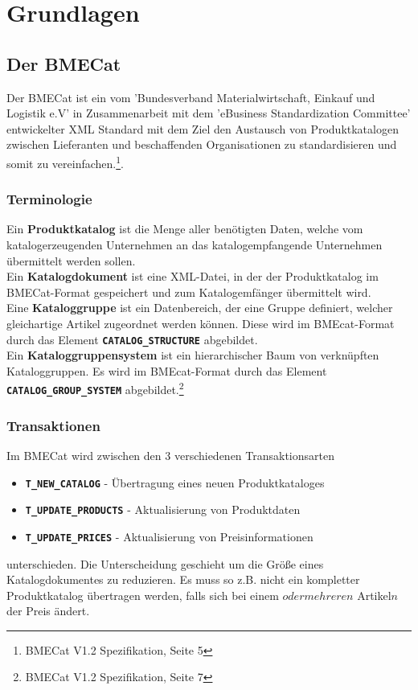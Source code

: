 \section{Grundlagen}
	\subsection{Der BMECat}
	
	Der BMECat ist ein vom 'Bundesverband Materialwirtschaft, Einkauf und Logistik e.V' in Zusammenarbeit mit dem 'eBusiness Standardization Committee' entwickelter XML
	Standard mit dem Ziel den Austausch von Produktkatalogen zwischen Lieferanten und beschaffenden Organisationen zu standardisieren und somit zu vereinfachen.\footnote{BMECat V1.2 Spezifikation, Seite 5}. 
	
	\subsubsection{Terminologie}
	Ein \textbf{Produktkatalog} ist die Menge aller benötigten Daten, welche vom katalogerzeugenden Unternehmen an das katalogempfangende Unternehmen übermittelt werden sollen.\\
	Ein \textbf{Katalogdokument} ist eine XML-Datei, in der der Produktkatalog im BMECat-Format gespeichert und zum Katalogemfänger übermittelt wird.\\
	Eine \textbf{Kataloggruppe} ist ein Datenbereich, der eine Gruppe definiert, welcher gleichartige Artikel zugeordnet werden können. Diese wird im BMEcat-Format durch das Element \texttt{\textbf{CATALOG\_STRUCTURE}} abgebildet.\\
	Ein \textbf{Kataloggruppensystem} ist ein hierarchischer Baum von verknüpften Kataloggruppen. Es wird
	im BMEcat-Format durch das Element \texttt{\textbf{CATALOG\_GROUP\_SYSTEM}} abgebildet.\footnote{BMECat V1.2 Spezifikation, Seite 7}
	
	\subsubsection{Transaktionen}
	Im BMECat wird zwischen den 3 verschiedenen Transaktionsarten
	\begin{itemize}
	\item \texttt{\textbf{T\_NEW\_CATALOG}} - Übertragung eines neuen Produktkataloges
	\item \texttt{\textbf{T\_UPDATE\_PRODUCTS}} - Aktualisierung von Produktdaten
	\item \texttt{\textbf{T\_UPDATE\_PRICES}} - Aktualisierung von Preisinformationen
	\end{itemize} 
	unterschieden. Die Unterscheidung geschieht um die Größe eines Katalogdokumentes zu reduzieren. Es muss so z.B. nicht ein kompletter Produktkatalog übertragen werden, falls sich bei einem \(oder mehreren\) Artikel\(n\) der Preis ändert.
	

